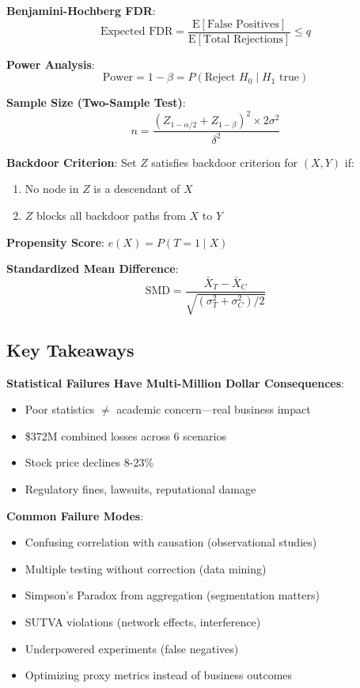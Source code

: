 \textbf{Benjamini-Hochberg FDR}:
\[
\text{Expected FDR} = \frac{\text{E}[\text{False Positives}]}{\text{E}[\text{Total Rejections}]} \leq q
\]

\textbf{Power Analysis}:
\[
\text{Power} = 1 - \beta = P(\text{Reject } H_0 \mid H_1 \text{ true})
\]

\textbf{Sample Size (Two-Sample Test)}:
\[
n = \frac{(Z_{1-\alpha/2} + Z_{1-\beta})^2 \times 2\sigma^2}{\delta^2}
\]

\textbf{Backdoor Criterion}: Set $Z$ satisfies backdoor criterion for $(X, Y)$ if:
\begin{enumerate}
    \item No node in $Z$ is a descendant of $X$
    \item $Z$ blocks all backdoor paths from $X$ to $Y$
\end{enumerate}

\textbf{Propensity Score}: $e(X) = P(T=1 \mid X)$

\textbf{Standardized Mean Difference}:
\[
\text{SMD} = \frac{\bar{X}_T - \bar{X}_C}{\sqrt{(\sigma_T^2 + \sigma_C^2)/2}}
\]

\subsection{Key Takeaways}

\textbf{Statistical Failures Have Multi-Million Dollar Consequences}:
\begin{itemize}
    \item Poor statistics $\neq$ academic concern---real business impact
    \item \$372M combined losses across 6 scenarios
    \item Stock price declines 8-23\%
    \item Regulatory fines, lawsuits, reputational damage
\end{itemize}

\textbf{Common Failure Modes}:
\begin{itemize}
    \item Confusing correlation with causation (observational studies)
    \item Multiple testing without correction (data mining)
    \item Simpson's Paradox from aggregation (segmentation matters)
    \item SUTVA violations (network effects, interference)
    \item Underpowered experiments (false negatives)
    \item Optimizing proxy metrics instead of business outcomes
\end{itemize}

